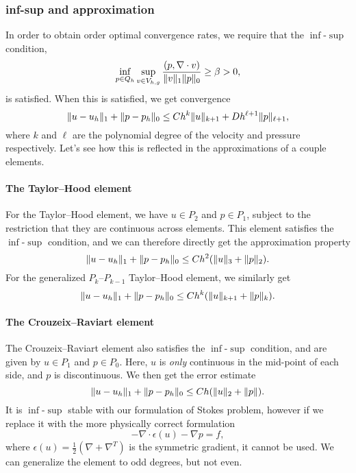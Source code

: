 \subsubsection{inf-sup and approximation}
In order to obtain order optimal convergence rates, we require that the $\inf$-$\sup$ condition,
\begin{equation}
    \inf_{p \in Q_h} \sup_{v \in V_{h, g}} \frac{(p, \nabla \cdot v)}{\lVert v\rVert_1 \lVert p\rVert_0}
    \geq \beta
    > 0,
\end{equation}
is satisfied.
When this is satisfied, we get convergence
\begin{equation}
    \lVert u - u_h\rVert_1 + \lVert p - p_h\rVert_0
    \leq C h^k \lVert u\rVert_{k+1} + D h^{\ell + 1} \lVert p\rVert_{\ell + 1},
\end{equation}
where $k$ and $\ell$ are the polynomial degree of the velocity and pressure respectively.
Let's see how this is reflected in the approximations of a couple elements.

\paragraph{The Taylor--Hood element} %
For the Taylor--Hood element, we have $u \in P_2$ and $p \in P_1$, subject to the restriction that they are continuous across elements. %
This element satisfies the $\inf$-$\sup$ condition, and we can therefore directly get the approximation property
\begin{equation}
    \lVert u - u_h\rVert_1 + \lVert p - p_h\rVert_0
    \leq C h^2 (\lVert u\rVert_3 + \lVert p\rVert_2).
\end{equation}
For the generalized $P_{k}$--$P_{k-1}$ Taylor--Hood element, we similarly get %
\begin{equation}
    \lVert u - u_h\rVert_1 + \lVert p - p_h\rVert_0
    \leq C h^k (\lVert u\rVert_{k+1} + \lVert p\rVert_k).
\end{equation}

\paragraph{The Crouzeix--Raviart element} %
The Crouzeix--Raviart element also satisfies the $\inf$-$\sup$ condition, and are given by $u \in P_1$ and $p \in P_0$. %
Here, $u$ is \emph{only} continuous in the mid-point of each side, and $p$ is discontinuous.
We then get the error estimate
\begin{equation}
    \lVert u - u_h\rVert_1 + \lVert p - p_h\rVert_0
    \leq C h (\lVert u\rVert_2 + \lVert p\rVert).
\end{equation}
It is $\inf$-$\sup$ stable with our formulation of Stokes problem, however if we replace it with the more physically correct formulation
\begin{equation}
    -\nabla \cdot \epsilon(u) - \nabla p = f,
\end{equation}
where $\epsilon(u) = \frac{1}{2} (\nabla + \nabla^T)$ is the symmetric gradient, it cannot be used.
We can generalize the element to odd degrees, but not even.


